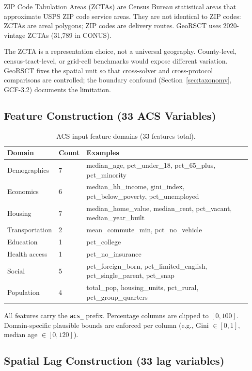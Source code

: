 \documentclass{article}
\begin{document}
ZIP Code Tabulation Areas (ZCTAs) are Census Bureau statistical areas that approximate USPS ZIP code service areas. They are not identical to ZIP codes: ZCTAs are areal polygons; ZIP codes are delivery routes. GeoRSCT uses 2020-vintage ZCTAs (31,789 in CONUS).

The ZCTA is a representation choice, not a universal geography. County-level, census-tract-level, or grid-cell benchmarks would expose different variation. GeoRSCT fixes the spatial unit so that cross-solver and cross-protocol comparisons are controlled; the boundary confound (Section~\ref{sec:taxonomy}, GCF-3.2) documents the limitation.

\subsection{Feature Construction (33 ACS Variables)}

\begin{table}[htbp]
\centering
\small
\caption{ACS input feature domains (33 features total).}
\label{tab:acs_domains}
\begin{tabular}{lll}
\toprule
\textbf{Domain} & \textbf{Count} & \textbf{Examples} \\
\midrule
Demographics & 7 & median\_age, pct\_under\_18, pct\_65\_plus, pct\_minority \\
Economics & 6 & median\_hh\_income, gini\_index, pct\_below\_poverty, pct\_unemployed \\
Housing & 7 & median\_home\_value, median\_rent, pct\_vacant, median\_year\_built \\
Transportation & 2 & mean\_commute\_min, pct\_no\_vehicle \\
Education & 1 & pct\_college \\
Health access & 1 & pct\_no\_insurance \\
Social & 5 & pct\_foreign\_born, pct\_limited\_english, pct\_single\_parent, pct\_snap \\
Population & 4 & total\_pop, housing\_units, pct\_rural, pct\_group\_quarters \\
\bottomrule
\end{tabular}
\end{table}

All features carry the \texttt{acs\_} prefix. Percentage columns are clipped to $[0, 100]$. Domain-specific plausible bounds are enforced per column (e.g., Gini $\in [0,1]$, median age $\in [0, 120]$).

\subsection{Spatial Lag Construction (33 lag variables)}
\end{document}
